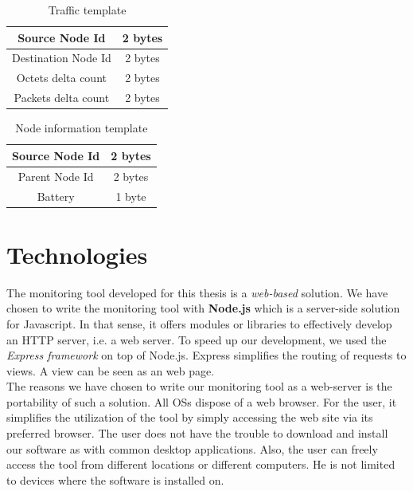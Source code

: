 \begin{table}
  \centering
  \begin{tabular}{|c|c|}
    \hline
    Source Node Id & 2 bytes \\
    \hline
    Destination Node Id & 2 bytes \\
    \hline
    Octets delta count & 2 bytes \\
    \hline
    Packets delta count & 2 bytes \\
    \hline
  \end{tabular}
  \caption{Traffic template}
  \label{table:traffic_template}
\end{table}

\begin{table}
  \centering
  \begin{tabular}{|c|c|}
    \hline
    Source Node Id & 2 bytes \\
    \hline
    Parent Node Id & 2 bytes \\
    \hline
    Battery & 1 byte \\
    \hline
  \end{tabular}
  \caption{Node information template}
  \label{table:node_template}
\end{table}


\section{Technologies}

The monitoring tool developed for this thesis is a \textit{web-based} solution. We have chosen to write the monitoring tool with \textbf{Node.js} \cite{website:nodejs} which is a server-side solution for Javascript. In that sense, it offers modules or libraries to effectively develop an HTTP server, i.e. a web server. To speed up our development, we used the \textit{Express framework} \cite{website:express} on top of Node.js. Express simplifies the routing of requests to views. A view can be seen as an web page. \\

The reasons we have chosen to write our monitoring tool as a web-server is the portability of such a solution. All OSs dispose of a web browser. For the user, it simplifies the utilization of the tool by simply accessing the web site via its preferred browser. The user does not have the trouble to download and install our software as with common desktop applications. Also, the user can freely access the tool from different locations or different computers. He is not limited to devices where the software is installed on. \\

